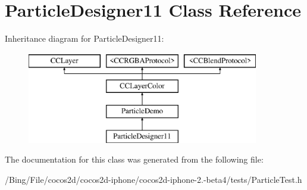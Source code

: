 \hypertarget{interface_particle_designer11}{\section{Particle\-Designer11 Class Reference}
\label{interface_particle_designer11}
}
Inheritance diagram for Particle\-Designer11\-:\begin{figure}[H]
\begin{center}
\leavevmode
\includegraphics[height=4.000000cm]{interface_particle_designer11}
\end{center}
\end{figure}


The documentation for this class was generated from the following file\-:\begin{DoxyCompactItemize}
\item 
/\-Bing/\-File/cocos2d/cocos2d-\/iphone/cocos2d-\/iphone-\/2.-\/beta4/tests/Particle\-Test.\-h\end{DoxyCompactItemize}
